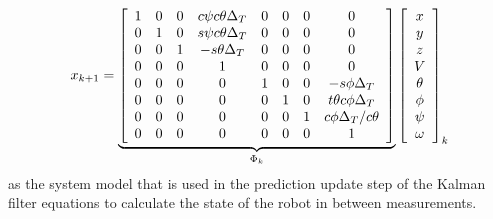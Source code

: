 \begin{align}
\label{eq:kfSystemModelWithAssumptions}
x_{k+1} = 
\underbrace{\left[\begin{array}{c c c c c c c c}
1 & 0 & 0 & c\psi c\theta \Delta_T & 0 & 0 & 0 & 0 \\
0 & 1 & 0 & s\psi c\theta \Delta_T & 0 & 0 & 0 & 0\\
0 & 0 & 1 & -s\theta \Delta_T & 0 & 0 & 0 & 0\\
0 & 0 & 0 & 1 & 0 & 0 & 0 & 0 \\
0 & 0 & 0 & 0 & 1 & 0 & 0 & -s\phi \Delta_T \\
0 & 0 & 0 & 0 & 0 & 1 & 0 & t\theta c\phi \Delta_T \\
0 & 0 & 0 & 0 & 0 & 0 & 1 & c\phi \Delta_T/c\theta \\
0 & 0 & 0 & 0 & 0 & 0 & 0 & 1
\end{array}\right]}_{\Phi_k}
\left[\begin{array}{c}
x \\ y \\ z \\ V \\ \theta \\ \phi \\ \psi \\ \omega
\end{array}\right]_k
\end{align}
as the system model that is used in the prediction update step of the Kalman filter equations to calculate the state of the robot in between measurements.


